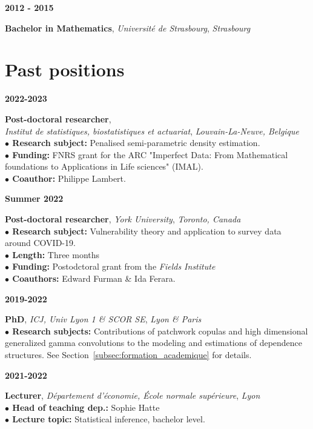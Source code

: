 \documentclass[a4paper,11pt]{article}
\newcommand{\tabcv}[2]{
\begin{minipage}[t]{0.12\linewidth}
\textbf{\footnotesize #1}
\end{minipage}\hfill
\begin{minipage}[t]{0.85\linewidth}
#2
\end{minipage}
\vspace{1em}
}
\begin{document}
\begin{flushleft}
\tabcv{2012 - 2015}{
\textbf{Bachelor in Mathematics}, \textit{Université de Strasbourg}, \textit{Strasbourg}\\[0.5em]
}

\clearpage
\section{Past positions}

\tabcv{2022-2023}{
\textbf{Post-doctoral researcher}, \\ \textit{Institut de statistiques, biostatistiques et actuariat}, \textit{Louvain-La-Neuve, Belgique}\\[0.5em]
{\footnotesize
\textbf{$\bullet$ Research subject:} Penalised semi-parametric density estimation.\\
\textbf{$\bullet$ Funding:} FNRS grant for the ARC "Imperfect Data:
From Mathematical foundations to Applications in Life sciences" (IMAL).\\
\textbf{$\bullet$ Coauthor:} Philippe Lambert.
}
}


\tabcv{Summer 2022}{
\textbf{Post-doctoral researcher}, \textit{York University}, \textit{Toronto, Canada}\\[0.5em]
{\footnotesize
\textbf{$\bullet$ Research subject:} Vulnerability theory and application to survey data around COVID-19. \\
\textbf{$\bullet$ Length:} Three months\\
\textbf{$\bullet$ Funding:} Postodctoral grant from the \textit{Fields Institute}\\
\textbf{$\bullet$ Coauthors:} Edward Furman \& Ida Ferara.
}
}


\tabcv{2019-2022}{
\textbf{PhD}, \textit{ICJ, Univ Lyon 1 \& SCOR SE}, \textit{Lyon \& Paris}\\[0.5em]
{\footnotesize
\textbf{$\bullet$ Research subjects:} Contributions of patchwork copulas and high dimensional generalized gamma convolutions to the modeling and estimations of dependence structures. See Section~\ref{subsec:formation_academique} for details.
}
}

\tabcv{2021-2022}{
\textbf{Lecturer}, \textit{Département d'économie, École normale supérieure}, \textit{Lyon}\\[0.5em]
{\footnotesize
\textbf{$\bullet$ Head of teaching dep.:} Sophie Hatte\\
\textbf{$\bullet$ Lecture topic:} Statistical inference, bachelor level.\\
}
}


\end{flushleft}
\end{document}
